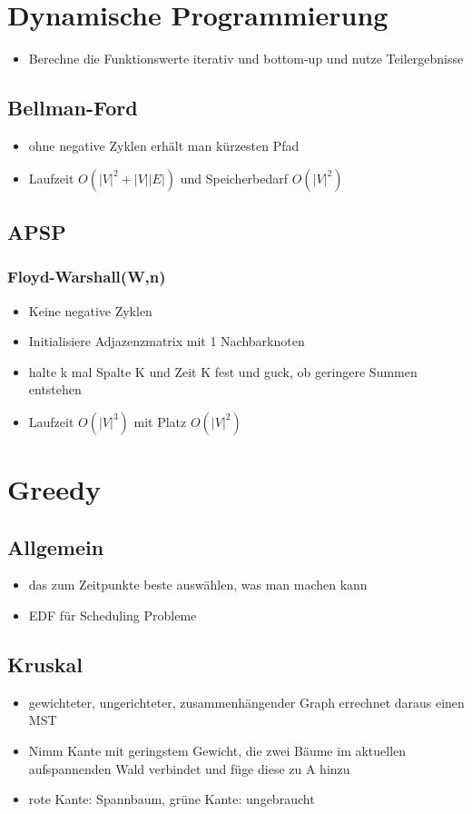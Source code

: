 \documentclass{article}
\begin{document}
\section{Dynamische Programmierung}
\begin{itemize}
\item Berechne die Funktionswerte iterativ und bottom-up und nutze Teilergebnisse
\end{itemize}
\subsection{Bellman-Ford}
\begin{itemize}
\item ohne negative Zyklen erh{\"a}lt man k{\"u}rzesten Pfad
\item  Laufzeit $O(|V|^2+|V||E|)$ und Speicherbedarf $O(|V|^2)$
\end{itemize}
\subsection{APSP}
\subsubsection{Floyd-Warshall(W,n)}
\begin{itemize}
\item Keine negative Zyklen
\item Initialisiere Adjazenzmatrix mit 1 Nachbarknoten
\item halte k mal Spalte K und Zeit K fest und guck, ob geringere Summen entstehen
\item Laufzeit $O(|V|^3)$ mit Platz $O(|V|^2)$
\end{itemize}



\section{Greedy}
\subsection{Allgemein}
\begin{itemize}
\item das zum Zeitpunkte beste ausw{\"a}hlen, was man machen kann
\item EDF f{\"u}r Scheduling Probleme
\end{itemize}
 
\subsection{Kruskal}
\begin{itemize}
\item gewichteter, ungerichteter, zusammenh{\"a}ngender Graph errechnet daraus einen MST
\item Nimm Kante mit geringstem Gewicht, die zwei B{\"a}ume im aktuellen aufspannenden Wald verbindet und f{\"u}ge diese zu A hinzu
\item rote Kante: Spannbaum, gr{\"u}ne Kante: ungebraucht
\end{itemize}
\end{document}
